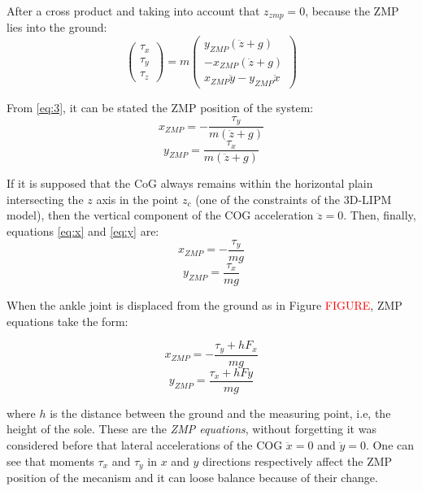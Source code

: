 After a cross product and taking into account that $z_{zmp} = 0$, because the ZMP lies into the ground:
\begin{equation}
\begin{pmatrix}
\tau_x \\
\tau_y \\
\tau_z 
\end{pmatrix} 
= m
\begin{pmatrix}
y_{ZMP}(\ddot{z}+g) \\
-x_{ZMP}(\ddot{z}+g) \\
x_{ZMP}\ddot{y}-y_{ZMP}\ddot{x}
\end{pmatrix}
\label{eq:3}
\end{equation}

From \eqref{eq:3}, it can be stated the ZMP position of the system:
\begin{equation}
x_{ZMP} = -\frac{\tau_y}{m(\ddot{z}+g)}
\label{eq:x}
\end{equation}
\begin{equation}
y_{ZMP} = \frac{\tau_x}{m(\ddot{z}+g)}
\label{eq:y}
\end{equation}

If it is supposed that the CoG always remains within the horizontal plain intersecting the $z$ axis in the point $z_c$ (one of the constraints of the 3D-LIPM model), then the vertical component of the COG acceleration $\ddot{z}=0$. Then, finally, equations \eqref{eq:x} and \eqref{eq:y} are:
\begin{equation}
x_{ZMP} = -\frac{\tau_y}{mg}
\label{eq:xzmp}
\end{equation}
\begin{equation}
y_{ZMP} = \frac{\tau_x}{mg}
\label{eq:yzmp}
\end{equation}

When the ankle joint is displaced from the ground as in Figure \textcolor{red}{FIGURE}, ZMP equations take the form:

\begin{equation}
x_{ZMP} = -\frac{\tau_y+hF_x}{mg}
\label{eq:xzmp}
\end{equation}
\begin{equation}
y_{ZMP} = \frac{\tau_x+hFy}{mg}
\label{eq:yzmp}
\end{equation}

where $h$ is the distance between the ground and the measuring point, i.e, the height of the sole. 
These are the \textit{ZMP equations}, without forgetting it was considered before that lateral accelerations of the COG $\ddot{x}=0$ and $\ddot{y}=0$. One can see that moments $\tau_x$ and $\tau_y$ in $x$ and $y$ directions respectively affect the ZMP position of the mecanism and it can loose balance because of their change.

